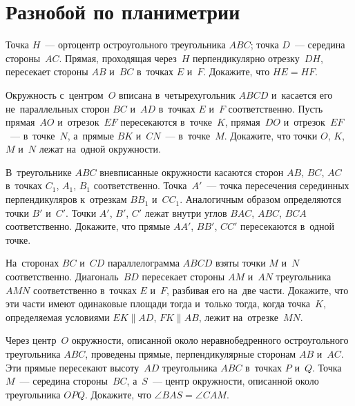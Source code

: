 
\section*{Разнобой по планиметрии}


\begin{problems}

\item
Точка $H$~--- ортоцентр остроугольного треугольника $ABC$;
точка $D$~--- середина стороны~$AC$.
Прямая, проходящая через~$H$ перпендикулярно отрезку~$DH$, пересекает стороны
$AB$ и~$BC$ в~точках $E$ и~$F$.
Докажите, что $HE = HF$.

\item
Окружность с~центром~$O$ вписана в~четырехугольник $ABCD$ и~касается его
не~параллельных сторон $BC$ и~$AD$ в~точках $E$ и~$F$ соответственно.
Пусть прямая~$AO$ и~отрезок~$EF$ пересекаются в~точке~$K$, прямая~$DO$
и~отрезок~$EF$~--- в~точке~$N$, а~прямые $BK$ и~$CN$~--- в~точке~$M$.
Докажите, что точки $O$, $K$, $M$ и~$N$ лежат на~одной окружности.

\item
В~треугольнике $ABC$ вневписанные окружности касаются сторон $AB$, $BC$, $AC$
в~точках $C_1$, $A_1$, $B_1$ соответственно.
Точка~$A'$~--- точка пересечения серединных перпендикуляров к~отрезкам
$B B_1$ и~$C C_1$.
Аналогичным образом определяются точки $B'$ и~$C'$.
Точки $A'$, $B'$, $C'$ лежат внутри углов $BAC$, $ABC$, $BCA$ соответственно.
Докажите, что прямые $AA'$, $BB'$, $CC'$ пересекаются в~одной точке.

\item
На~сторонах $BC$ и~$CD$ параллелограмма $ABCD$ взяты точки $M$ и~$N$
соответственно.
Диагональ~$BD$ пересекает стороны $AM$ и~$AN$ треугольника $AMN$ соответственно
в~точках $E$ и~$F$, разбивая его на~две части.
Докажите, что эти части имеют одинаковые площади тогда и~только тогда, когда
точка~$K$, определяемая условиями $EK \parallel AD$, $FK \parallel AB$, лежит
на~отрезке~$MN$.

\item
Через центр~$O$ окружности, описанной около неравнобедренного остроугольного
треугольника $ABC$, проведены прямые, перпендикулярные сторонам $AB$ и~$AC$.
Эти прямые пересекают высоту~$AD$ треугольника $ABC$ в~точках $P$ и~$Q$.
Точка~$M$~--- середина стороны~$BC$, а~$S$~--- центр окружности, описанной
около треугольника $OPQ$.
Докажите, что $\angle BAS = \angle CAM$.


\end{problems}
